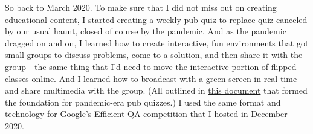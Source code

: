 So back to March 2020. To make sure that I did not miss out on
creating educational content, I started creating a weekly pub quiz to
replace quiz canceled by our usual haunt, closed of course by the
pandemic.  And as the pandemic dragged on and on, I learned how to
create interactive, fun environments that got small groups to discuss
problems, come to a solution, and then share it with the group---the
same thing that I'd need to move the interactive portion of flipped
classes online.  And I
learned how to broadcast with a green screen in real-time and share
multimedia with the group.  (All outlined in \href{https://docs.google.com/document/d/1YesfpZ_-b2mT3BkTrlOLD5epZxz4uF1DqUkHZHrn344/edit?usp=sharing}{this document} that formed
the foundation for pandemic-era pub quizzes.)  I used the same
format and technology for \href{https://sites.google.com/view/qanta/past-events/neurips-2020-efficient-qa}{Google's Efficient QA competition} that I
hosted in December 2020.






